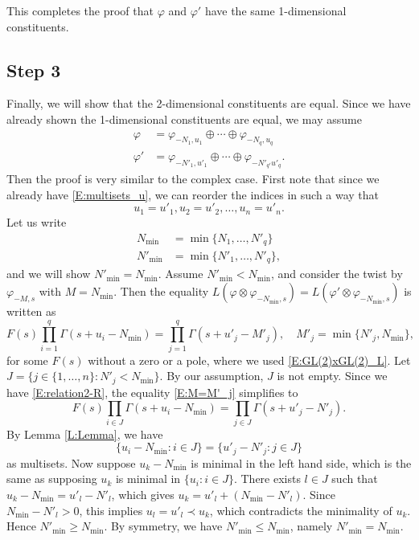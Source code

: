 \documentclass[11pt]{amsart}
\theoremstyle{plain}
\theoremstyle{definition}
\numberwithin{equation}{section}
\begin{document}
 This completes the proof that $\varphi$ and $\varphi'$
have the same 1-dimensional constituents.

\subsection{Step 3}
Finally, we will show that the 2-dimensional constituents are
equal. Since we have already shown the 1-dimensional constituents are
equal, we may assume
\begin{align*}
\varphi&=\varphi_{-N_1,u_1}\oplus\cdots\oplus\varphi_{-N_q, u_q}\\
\varphi'&=\varphi_{-N'_1,u'_1}\oplus\cdots\oplus\varphi_{-N'_{q'} u'_{q}}.
\end{align*}
Then the proof is very similar to the complex case. First note that
since we already have \eqref{E:multisets_u}, we can
reorder the indices in such a way that
\begin{equation}\label{E:relation2-R}
u_1=u'_1, u_2=u'_2,\dots, u_n=u'_n.
\end{equation}
Let us write
\begin{align*}
N_{\min}&=\min\{N_1,\dots, N'_q\}\\
N'_{\min}&=\min\{N'_1,\dots, N'_q\},
\end{align*}
and we will show $N'_{\min}=N_{\min}$. Assume
$N'_{\min}<N_{\min}$, and consider the twist by $\varphi_{-M, s}$
with $M=N_{\min}$. Then the equality
$L(\varphi\otimes\varphi_{-N_{\min},s})=L(\varphi'\otimes\varphi_{-N_{\min},s})$ is
written as
\begin{equation}\label{E:M=M'_j}
F(s)\prod_{i=1}^q\Gamma(s+u_i-N_{\min})=\prod_{j=1}^q\Gamma(s+u'_j-M'_j),
\quad M'_j=\min\{N'_j, N_{\min}\},
\end{equation}
for some $F(s)$ without a zero or a pole, where we used \eqref{E:GL(2)xGL(2)_L}.
Let $J=\{j\in\{1,\dots,n\}: N'_j<N_{\min}\}$. By our assumption, $J$ is not
empty. Since we have \eqref{E:relation2-R}, the equality
\eqref{E:M=M'_j} simplifies to
\begin{equation}\label{E:M=M'_j2}
F(s)\prod_{i\in J}\Gamma(s+u_i-N_{\min})=\prod_{j\in J}\Gamma(s+u'_j-N'_j).
\end{equation}
By Lemma \ref{L:Lemma}, we have
\[
\{u_i-N_{\min}: i\in J\}=\{u'_j-N'_j: j\in J\}
\]
as multisets. Now suppose $u_k-N_{\min}$ is minimal in the left hand
side, which is the same as supposing 
$u_k$ is minimal in $\{u_i: i\in J\}$. There exists $l\in J$
such that $u_k-N_{\min}=u'_l-N'_l$, which gives
$u_k=u'_l+(N_{\min}-N'_l)$.  Since $N_{\min}-N'_l>0$, this implies
$u_l=u'_l\prec u_k$, which contradicts the
minimality of $u_k$. Hence $N'_{\min}\geq N_{\min}$. By symmetry, we
have $N'_{\min}\leq N_{\min}$, namely $N'_{\min}=N_{\min}$.
\end{document}

